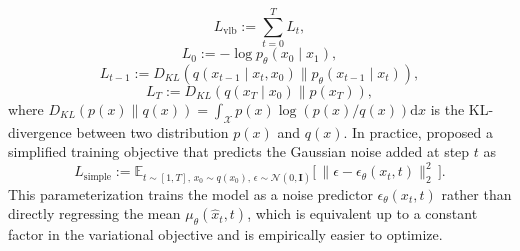 \documentclass{article}
\newcommand{\todoa}[2][]{\todo[size=tiny,color=blue!20!white,#1]{GA: #2}\xspace}
\begin{document}
\begin{equation}
L_{\mathrm{vlb}}  := \sum_{t=0}^T L_t ,
\end{equation}
\begin{equation}
L_0  :=-\log p_\theta\left(x_0 \mid x_1\right) ,
\end{equation}
\begin{equation}
L_{t-1} :=D_{K L}\left(q\left(x_{t-1} \mid x_t, x_0\right) \| p_\theta\left(x_{t-1} \mid x_t\right)\right),
\end{equation}
\begin{equation}
L_T :=D_{K L}\left(q\left(x_T \mid x_0\right) \| p\left(x_T\right)\right),
\end{equation}
where $D_{K L}(p(x)\| q(x))=\int_{\mathcal{X}} p(x)\log(p(x)/q(x))\mathrm{d}x$ is the KL-divergence between two distribution $p(x)$ and $q(x)$.
In practice, \cite{ho2020denoising} proposed a simplified training objective that
predicts the Gaussian noise added at step $t$ as
\begin{equation}
L_{\text{simple}}
:= \mathbb{E}_{t \sim \left[ 1,T\right],\, x_0 \sim q(x_0),\, \epsilon \sim \mathcal{N}(0,\mathbf{I})}
\big[\,\|\epsilon - \epsilon_\theta(x_t,t)\|_2^2\,\big].
\end{equation}
This parameterization trains the model as a noise predictor $\epsilon_\theta(x_t,t)$ rather than directly regressing the mean $\mu_\theta(\hat{x}_t,t)$, which is equivalent up to a constant factor in the variational objective and is empirically easier to optimize.
\end{document}

